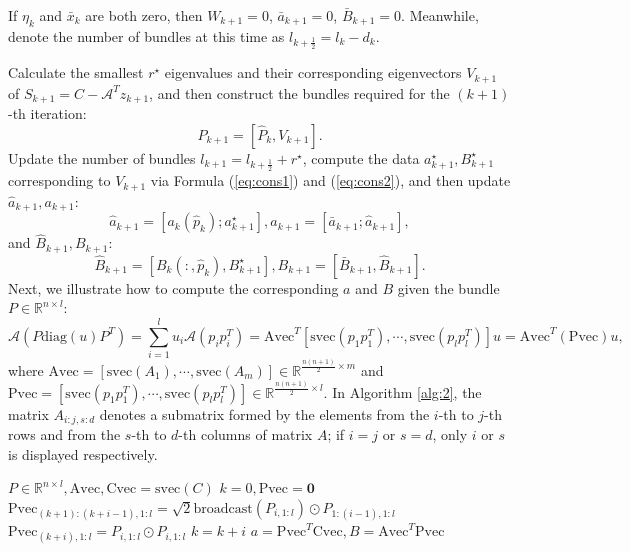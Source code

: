 \documentclass{jcmlatex}
\begin{document}
If \(\eta_{k}\) and \(\bar{x}_{k}\) are both zero, then \(W_{k+1}=0\), \(\bar{a}_{k+1}=0\), \(\bar{B}_{k+1}=0\). Meanwhile, denote the number of bundles at this time as \(l_{k+\frac{1}{2}} = l_{k} - d_{k}\).

Calculate the smallest \(r^{\star}\) eigenvalues and their corresponding eigenvectors \(V_{k+1}\) of \(S_{k+1}=C-\mathcal{A}^{T}z_{k+1}\), and then construct the bundles required for the \((k+1)\)-th iteration:
\begin{equation}\label{eq:update3}
P_{k+1}=[\hat{P}_{k},V_{k+1}]. 
\end{equation}
Update the number of bundles \(l_{k+1} = l_{k+\frac{1}{2}} + r^{\star}\), compute the data \(a_{k+1}^\star, B_{k+1}^\star\) corresponding to \(V_{k+1}\) via Formula (\ref{eq:cons1}) and (\ref{eq:cons2}), and then update \(\hat{a}_{k+1}, a_{k+1}\):
\begin{equation}\label{eq:update4}
\hat{a}_{k+1} = [a_{k}(\hat{p}_{k});a_{k+1}^{\star}], a_{k+1} = [\bar{a}_{k+1}; \hat{a}_{k+1}],
\end{equation}
and \(\hat{B}_{k+1}, B_{k+1}\):
\begin{equation}\label{eq:update5}
\hat{B}_{k+1} = [ B_{k}(:,\hat{p}_{k}), B_{k+1}^{\star}], B_{k+1} = [\bar{B}_{k+1},\hat{B}_{k+1}].
\end{equation}
Next, we illustrate how to compute the corresponding \(a\) and \(B\) given the bundle \(P\in \mathbb{R}^{n \times l}\):
\begin{equation*}
\mathcal{A}(P\text{diag}(u)P^{T})=\sum_{i=1}^{l}u_{i}\mathcal{A}(p_{i}p_{i}^{T})=\text{Avec}^{T}[\text{svec}(p_{1}p_{1}^{T}),\cdots,\text{svec}(p_{l}p_{l}^{T})]u=\text{Avec}^{T}(\text{Pvec})u,
\end{equation*}
where \(\text{Avec}=[\text{svec}(A_{1}),\cdots,\text{svec}(A_{m})]\in \mathbb{R}^{\frac{n(n+1)}{2}\times m}\) and \(\text{Pvec}=[\text{svec}(p_{1}p_{1}^{T}),\cdots,\text{svec}(p_{l}p_{l}^{T})]\in \mathbb{R}^{\frac{n(n+1)}{2}\times l}\). In Algorithm \ref{alg:2}, the matrix \(A_{i:j,s:d}\) denotes a submatrix formed by the elements from the \(i\)-th to \(j\)-th rows and from the \(s\)-th to \(d\)-th columns of matrix \(A\); if \(i = j\) or \(s = d\), only \(i\) or \(s\) is displayed respectively.
\begin{algorithm}\label{alg3.1}
\caption{Generate \(\text{Pvec},a,B\)}\label{alg:2}
\begin{algorithmic}[1]
    \Require $P\in \mathbb{R}^{n\times l},\text{Avec},\text{Cvec}=\text{svec}(C)$ 
    \State \(k=0,\text{Pvec}=\mathbf{0}\)
    \State \(\text{Pvec}_{(k+1):(k+i-1),1:l}=\sqrt{2}\text{broadcast}(P_{i,1:l})\odot P_{1:(i-1),1:l}\)
    \State \(\text{Pvec}_{(k+i),1:l}=P_{i,1:l}\odot P_{i,1:l}\)
    \State \(k=k+i\)
    \EndFor
    \State \Return\(a=\text{Pvec}^{T}\text{Cvec},B=\text{Avec}^{T}\text{Pvec}\)
\end{algorithmic}
\end{algorithm}
\end{document}
